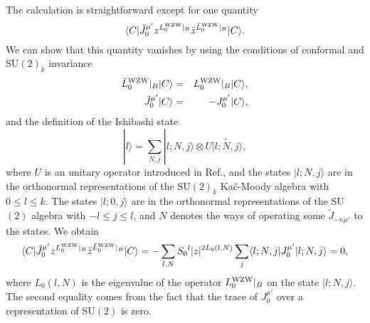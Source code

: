 \documentclass[a4paper,prd,preprint]{revtex4}
\begin{document}
The calculation is straightforward except for one quantity
\begin{equation}
 \langle C | {\tilde J}_0^{\mu'} z^{L_0^{\rm WZW}\vert_B}
             {\bar z}^{{\tilde L}_0^{\rm WZW}\vert_B}
 | C \rangle.
\end{equation}
We can show that this quantity vanishes
 by using the conditions of
 conformal and SU$(2)_k$ invariance
\begin{eqnarray}
 {\tilde L}_0^{\rm WZW}\vert_B | C \rangle
  &=& L_0^{\rm WZW}\vert_B | C \rangle,
\\
 {\tilde J}_0^{\mu'} | C \rangle &=& - J_0^{\mu'} | C \rangle,
\end{eqnarray}
 and the definition of the Ishibashi state
\begin{equation}
 | l \rangle 
 = \sum_{N,j} | l; N, j \rangle
   \otimes U \widetilde {| l; N, j \rangle},
\end{equation}
 where $U$ is an unitary operator introduced in Ref.\cite{Ishibashi},
 and the states $| l; N, j \rangle$
 are in the orthonormal representations
 of the SU$(2)_k$ Ka\v c-Moody algebra with $0 \le l \le k$.
The states $| l; 0, j \rangle$ are in the orthonormal representations
 of the SU$(2)$ algebra with $-l \le j \le l$,
 and $N$ denotes the ways of operating some ${\tilde J}_{-n \mu'}$
 to the states.
We obtain
\begin{equation}
 \langle C | {\tilde J}_0^{\mu'} z^{L_0^{\rm WZW}\vert_B}
             {\bar z}^{{\tilde L}_0^{\rm WZW}\vert_B}
 | C \rangle
 = - \sum_{l,N} S_0{}^l |z|^{2 L_0(l,N)}
     \sum_j \langle l;N,j| J_0^{\mu'} |l;N,j \rangle = 0,
\end{equation}
 where $L_0(l,N)$ is the eigenvalue
 of the operator $L_0^{\rm WZW}\vert_B$
 on the state $|l;N,j \rangle$.
The second equality comes from the fact that
 the trace of $J_0^{\mu'}$ over a representation of SU$(2)$ is zero.
\end{document}
